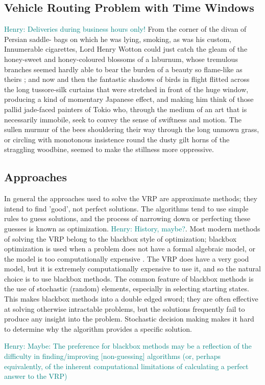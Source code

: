 \documentclass{sig-alternate}
\newcommand{\allcomments}[1]{{#1}}
\newcommand{\hfcomment}[1]{\textcolor{Teal}{\allcomments{Henry: {#1}}}}
\begin{document}
\subsection{Vehicle Routing Problem with Time Windows}
\hfcomment{Deliveries during business hours only!}
From the corner of the divan of Persian saddle- 
bags on which he was lying, smoking, as was his 
custom, Innumerable cigarettes, Lord Henry Wotton 
could just catch the gleam of the honey-sweet and 
honey-coloured blossoms of a laburnum, whose 
tremulous branches seemed hardly able to bear the 
burden of a beauty so flame-like as theirs ; and 
now and then the fantastic shadows of birds in 
flight flitted across the long tussore-silk curtains 
that were stretched in front of the huge window, 
producing a kind of momentary Japanese effect, 
and making him think of those pallid jade-faced 
painters of Tokio who, through the medium of an 
art that is necessarily immobile, seek to convey the 
sense of swiftness and motion. The sullen murmur 
of the bees shouldering their way through the long 
unmown grass, or circling with monotonous insistence 
round the dusty gilt horns of the straggling woodbine, 
seemed to make the stillness more oppressive.
\subsection{Approaches}
In general the approaches used to solve the VRP are approximate methods; they intend to find 'good', not perfect solutions. The algorithms tend to use simple rules to guess solutions, and the process of narrowing down or perfecting these guesses is known as optimization. \hfcomment{History, maybe?}. Most modern methods of solving the VRP belong to the blackbox style of optimization; blackbox optimization is used when a problem does not have a formal algebraic model, or the model is too computationally expensive \cite{Amaran:2014}. The VRP does have a very good model, but it is extremely computationally expensive to use it, and so the natural choice is to use blackbox methods. The common feature of blackbox methods is the use of stochastic (random) elements, especially in selecting starting states. This makes blackbox methods into a double edged sword; they are often effective at solving otherwise intractable problems, but the solutions frequently fail to produce any insight into the problem. Stochastic decision making makes it hard to determine why the algorithm provides a specific solution. 

\hfcomment{Maybe: The preference for blackbox methods may be a reflection of the difficulty in finding/improving [non-guessing] algorithms (or, perhaps equivalently, of the inherent computational limitations of calculating a perfect answer to the VRP)}
\end{document}
